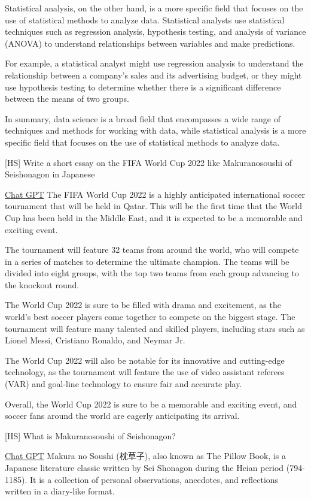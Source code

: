 \documentclass[
]{book}
\theoremstyle{definition}
\theoremstyle{definition}
\theoremstyle{definition}
\theoremstyle{definition}
\theoremstyle{remark}
\begin{document}
Statistical analysis, on the other hand, is a more specific field that focuses on the use of statistical methods to analyze data. Statistical analysts use statistical techniques such as regression analysis, hypothesis testing, and analysis of variance (ANOVA) to understand relationships between variables and make predictions.

For example, a statistical analyst might use regression analysis to understand the relationship between a company's sales and its advertising budget, or they might use hypothesis testing to determine whether there is a significant difference between the means of two groups.

In summary, data science is a broad field that encompasses a wide range of techniques and methods for working with data, while statistical analysis is a more specific field that focuses on the use of statistical methods to analyze data.

{[}HS{]} Write a short essay on the FIFA World Cup 2022 like Makuranosoushi of Seishonagon in Japanese

\protect\hyperlink{chatgpt}{Chat GPT} The FIFA World Cup 2022 is a highly anticipated international soccer tournament that will be held in Qatar. This will be the first time that the World Cup has been held in the Middle East, and it is expected to be a memorable and exciting event.

The tournament will feature 32 teams from around the world, who will compete in a series of matches to determine the ultimate champion. The teams will be divided into eight groups, with the top two teams from each group advancing to the knockout round.

The World Cup 2022 is sure to be filled with drama and excitement, as the world's best soccer players come together to compete on the biggest stage. The tournament will feature many talented and skilled players, including stars such as Lionel Messi, Cristiano Ronaldo, and Neymar Jr.

The World Cup 2022 will also be notable for its innovative and cutting-edge technology, as the tournament will feature the use of video assistant referees (VAR) and goal-line technology to ensure fair and accurate play.

Overall, the World Cup 2022 is sure to be a memorable and exciting event, and soccer fans around the world are eagerly anticipating its arrival.

{[}HS{]} What is Makuranosoushi of Seishonagon?

\protect\hyperlink{chatgpt}{Chat GPT} Makura no Soushi (枕草子), also known as The Pillow Book, is a Japanese literature classic written by Sei Shonagon during the Heian period (794-1185). It is a collection of personal observations, anecdotes, and reflections written in a diary-like format.
\end{document}

